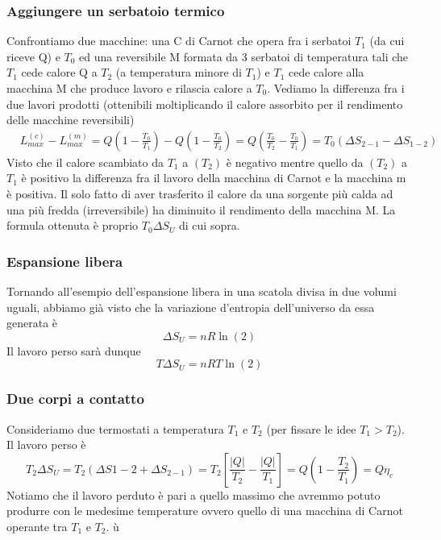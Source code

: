 \documentclass[10pt,a4paper]{article}
\begin{document}
\subsubsection{Aggiungere un serbatoio termico}
Confrontiamo due macchine: una C di Carnot che opera fra i serbatoi \(T_1\) (da cui riceve Q) e \(T_0\) ed una reversibile M formata da 3 serbatoi di temperatura tali che \(T_1\) cede calore Q a \(T_2\) (a temperatura minore di \(T_1\)) e \(T_1\) cede calore alla macchina M che produce lavoro e rilascia calore a \(T_0\). Vediamo la differenza fra i due lavori prodotti (ottenibili moltiplicando il calore assorbito per il rendimento delle macchine reversibili)
\begin{align*}
	&L_{max}^{(c)}-L_{max}^{(m)}=Q\left(1-\frac{T_0}{T_1}\right)-Q\left(1-\frac{T_0}{T_2}\right)=Q\left(\frac{T_0}{T_2}-\frac{T_0}{T_1}\right)=T_0(\Delta S_{2-1}-\Delta S_{1-2}) 
\end{align*}
Visto che il calore scambiato da \(T_1\) a \((T_2)\) è negativo mentre quello da \((T_2)\) a \(T_1\) è positivo la differenza fra il lavoro della macchina di Carnot e la macchina m è positiva. Il solo fatto di aver trasferito il calore da una sorgente più calda ad una più fredda (irreversibile) ha diminuito il rendimento della macchina M. La formula ottenuta è proprio \(T_0\Delta S_U\) di cui sopra. 
\subsubsection{Espansione libera}
Tornando all'esempio dell'espansione libera in una scatola divisa in due volumi uguali, abbiamo già visto che la variazione d'entropia dell'universo da essa generata è \[\Delta S_U = n R \ln(2)\]
Il lavoro perso sarà dunque \[T\Delta S_U = n R T \ln(2)\]
\subsubsection{Due corpi a contatto}
Consideriamo due termostati a temperatura \(T_1\) e \(T_2\) (per fissare le idee \(T_1 > T_2\)). Il lavoro perso è 
\[T_2 \Delta S_U = T_2(\Delta S{1-2}+\Delta S_{2-1})=T_2\left[\frac{|Q|}{T_2}-\frac{|Q|}{T_1}\right] = Q\left(1-\frac{T_2}{T_1}\right) =Q\eta_c\]
Notiamo che il lavoro perduto è pari a quello massimo che avremmo potuto produrre con le medesime temperature ovvero quello di una macchina di Carnot operante tra \(T_1\) e \(T_2\). ù
\end{document}
